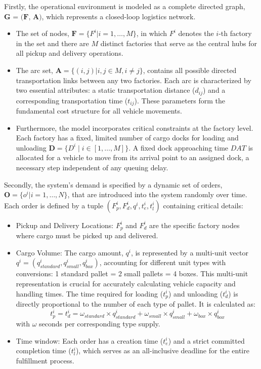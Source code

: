 \documentclass[pdflatex]{sn-jnl}
\begin{document}
Firstly, the operational environment is modeled as a complete directed graph, $\textbf{G = (F, A)}$, which represents a closed-loop logistics network. 
\begin{itemize}
    \item The set of nodes, $\textbf{F} = \{F^i | i = 1, \dots, M\}$, in which $F^i$ denotes the $i$-th factory in the set and there are $M$ distinct factories that serve as the central hubs for all pickup and delivery operations.
    
    \item The arc set, $\textbf{A} = \{(i, j) | i, j \in M, i \neq j\}$, contains all possible directed transportation links between any two factories. Each arc is characterized by two essential attributes: a static transportation distance ($d_{ij}$) and a corresponding transportation time ($t_{ij}$). These parameters form the fundamental cost structure for all vehicle movements.

    \item Furthermore, the model incorporates critical constraints at the factory level. Each factory has a fixed, limited number of cargo docks for loading and unloading $\textbf{D} = \{ D^i \mid i \in [1 , \dots , M]\}$. A fixed dock approaching time $DAT$ is allocated for a vehicle to move from its arrival point to an assigned dock, a necessary step independent of any queuing delay.

\end{itemize}

Secondly, the system's demand is specified by a dynamic set of orders, $\textbf{O} = \{o^i | i = 1, \dots, N\}$, that are introduced into the system randomly over time. Each order is defined by a tuple $(F_{p}^i, F_{d}^i, q^i, t_{e}^i, t_{l}^i)$ containing critical details:
\begin{itemize}
    \item Pickup and Delivery Locations: $F_{p}^i$ and $F_{d}^i$ are the specific factory nodes where cargo must be picked up and delivered.
    
    \item Cargo Volume: The cargo amount, $q^i$, is represented by a multi-unit vector $q^i = (q_{standard}^i, q_{small}^i, q_{box}^i)$, accounting for different unit types with conversions: 1 standard pallet = 2 small pallets = 4 boxes. This multi-unit representation is crucial for accurately calculating vehicle capacity and handling times. The time required for loading ($t_p^i$) and unloading ($t_d^i$) is directly proportional to the number of each type of pallet. It is calculated as:
\begin{equation}
t_p^i = t_d^i = \omega_{standard} \times q_{standard}^i 
+ \omega_{small} \times q_{small}^i 
+ \omega_{box} \times q_{box}^i
\end{equation}
    with $\omega$ seconds per corresponding type supply. 
    
    \item Time window: Each order has a creation time ($t_{e}^i$) and a strict committed completion time ($t_{l}^i$), which serves as an all-inclusive deadline for the entire fulfillment process.
\end{itemize}
\end{document}
